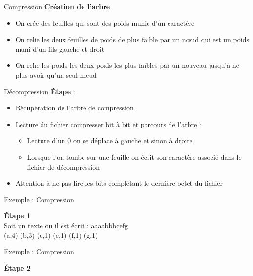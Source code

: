 \documentclass[french]{beamer}
\begin{document}
\begin{frame}{Compression}
	\textbf{Création de l'arbre}	\\
	\begin{itemize}
			\item<1-3> On crée des feuilles qui sont des poids munie d'un caractère
			\item<2-3> On relie les deux feuilles de poids de plus faible par un nœud qui est un poids muni d'un fils gauche et droit
			\item<3> On relie les poids les deux poids les plus faibles par un nouveau  jusqu'à ne plus avoir qu'un seul nœud
		\end{itemize}
\end{frame}

\begin{frame}{Décompression}
\textbf{Étape} :\\
\begin{itemize}
\item<1-5> Récupération de l'arbre de compression
\item<2-5> Lecture du fichier compresser bit à bit et parcours de l'arbre :
	\begin{itemize}
		\item<3-5> Lecture d'un 0 on se déplace à gauche et sinon à droite
		\item<4-5> Lorsque l'on tombe sur une feuille on écrit son caractère associé dans le fichier de décompression
	\end{itemize}
\item<5> Attention à ne pas lire les bits complétant le dernière octet du fichier
\end{itemize}
\end{frame}

\begin{frame}{Exemple : Compression}
	\begin{center}
	\textbf{Étape 1} \\
	Soit un texte ou il est écrit :  aaaabbbcefg \\
	(a,4) (b,3) (c,1) (e,1) (f,1) (g,1)
	\end{center}
\end{frame}

\begin{frame}{Exemple : Compression}
	\begin{center}
	\textbf{Étape 2} \\
	\end{center}
\end{frame}
\end{document}
